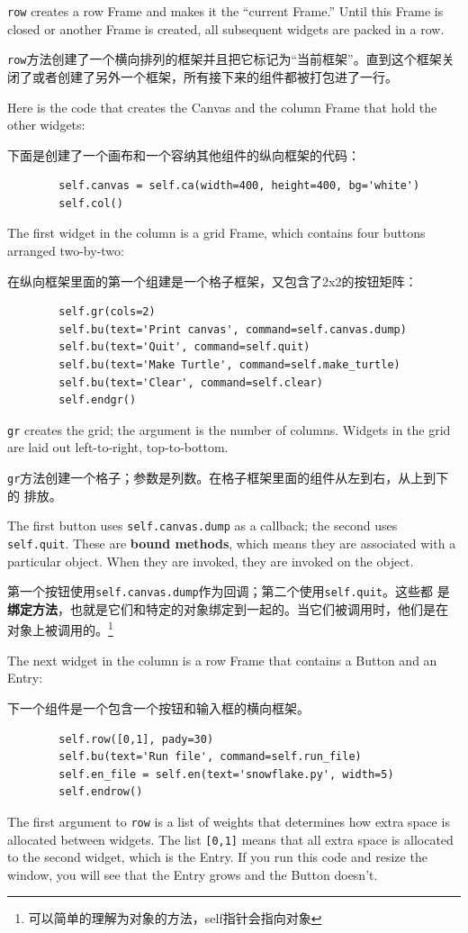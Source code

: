 \documentclass[10pt]{book}
\begin{document}
\begin{CJK}{UTF8}{gbsn}
{\tt row} creates a row Frame and makes it the ``current Frame.''
Until this Frame is closed or another Frame is created, all
subsequent widgets are packed in a row.

{\tt row}方法创建了一个横向排列的框架并且把它标记为``当前框架''。直到这个框架关
闭了或者创建了另外一个框架，所有接下来的组件都被打包进了一行。

Here is the code that creates the Canvas and the column Frame
that hold the other widgets:

下面是创建了一个画布和一个容纳其他组件的纵向框架的代码：

\begin{verbatim}
        self.canvas = self.ca(width=400, height=400, bg='white')
        self.col()
\end{verbatim}
%
The first widget in the column is a grid Frame, which contains
four buttons arranged two-by-two:

在纵向框架里面的第一个组建是一个格子框架，又包含了2x2的按钮矩阵：

\begin{verbatim}
        self.gr(cols=2)
        self.bu(text='Print canvas', command=self.canvas.dump)
        self.bu(text='Quit', command=self.quit)
        self.bu(text='Make Turtle', command=self.make_turtle)
        self.bu(text='Clear', command=self.clear)
        self.endgr()
\end{verbatim}
%
{\tt gr} creates the grid; the argument is the number of
columns.  Widgets in the grid are
laid out left-to-right, top-to-bottom.

{\tt gr}方法创建一个格子；参数是列数。在格子框架里面的组件从左到右，从上到下的
排放。

The first button uses {\tt self.canvas.dump} as a callback; the second
uses {\tt self.quit}.  These are {\bf bound methods}, which means they
are associated with a particular object.  When they are invoked, they
are invoked on the object.

第一个按钮使用{\tt self.canvas.dump}作为回调；第二个使用{\tt self.quit}。这些都
是{\bf 绑定方法}，也就是它们和特定的对象绑定到一起的。当它们被调用时，他们是在
对象上被调用的。\footnote{可以简单的理解为对象的方法，self指针会指向对象}

The next widget in the column is a row Frame that contains
a Button and an Entry:

下一个组件是一个包含一个按钮和输入框的横向框架。

\begin{verbatim}
        self.row([0,1], pady=30)
        self.bu(text='Run file', command=self.run_file)
        self.en_file = self.en(text='snowflake.py', width=5)
        self.endrow()
\end{verbatim}
%
The first argument to {\tt row} is a list of weights that
determines how extra space is allocated between widgets.  
The list {\tt [0,1]} means that all extra space is allocated
to the second widget, which is the Entry.  If you run this code
and resize the window, you will see that the Entry grows and
the Button doesn't.


\end{CJK}
\end{document}
